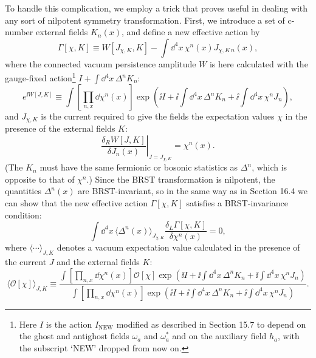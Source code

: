 To handle this complication, we employ a trick that proves useful in dealing with any sort of nilpotent symmetry transformation. First, we introduce a set of c-number external fields $K_n(x)$, and define a new effective action by
\begin{equation}
\Gamma[\chi,K]\equiv W[J_{\chi,K},K]
-\int \dd^4x\,\chi^n(x)J_{\chi,K\,n}(x),
\tag{17.1.3}\label{eq:17.1.3}
\end{equation}
where the connected vacuum persistence amplitude $W$ is here calculated with the gauge-fixed action\footnote{Here $I$ is the action $I_{\mathrm{NEW}}$ modified as described in Section 15.7 to depend on the ghost and antighost fields $\omega_a$ and $\omega_a^*$ and on the auxiliary field $h_a$, with the subscript `NEW' dropped from now on.} $I+\int \dd^4x\,\Delta^nK_n$:
\begin{equation}
e^{\ii W[J,K]}\equiv
\int\left[\prod_{n,x}\dd\chi^n(x)\right]
\exp\left(\ii I+\ii\int \dd^4x\,\Delta^nK_n
+\ii\int \dd^4x\,\chi^nJ_n\right),
\tag{17.1.4}\label{eq:17.1.4}
\end{equation}
and $J_{\chi,K}$ is the current required to give the fields the expectation values $\chi$ in the presence of the external fields $K$:
\begin{equation}
\left.\frac{\delta_R W[J,K]}{\delta J_n(x)}\right|_{J=J_{\chi,K}}
=\chi^n(x).
\tag{17.1.5}\label{eq:17.1.5}
\end{equation}
(The $K_n$ must have the same fermionic or bosonic statistics as $\Delta^n$, which is opposite to that of $\chi^n$.) Since the BRST transformation is nilpotent, the quantities $\Delta^n(x)$ are BRST-invariant, so in the same way as in Section 16.4 we can show that the new effective action $\Gamma[\chi,K]$ satisfies a BRST-invariance condition:
\begin{equation}
\int \dd^4x\,\langle\Delta^n(x)\rangle_{J_{\chi,K}}
\frac{\delta_L\Gamma[\chi,K]}{\delta\chi^n(x)}=0,
\tag{17.1.6}\label{eq:17.1.6}
\end{equation}
where $\langle\cdots\rangle_{J,K}$ denotes a vacuum expectation value calculated in the presence of the current $J$ and the external fields $K$:
\begin{equation}
\langle\mathcal O[\chi]\rangle_{J,K}\equiv
\frac{
\int\left[\prod_{n,x}\dd\chi^n(x)\right]\mathcal O[\chi]
\exp\left(\ii I+\ii\int \dd^4x\,\Delta^nK_n+\ii\int \dd^4x\,\chi^nJ_n\right)
}{
\int\left[\prod_{n,x}\dd\chi^n(x)\right]
\exp\left(\ii I+\ii\int \dd^4x\,\Delta^nK_n+\ii\int \dd^4x\,\chi^nJ_n\right)
}.
\tag{17.1.7}\label{eq:17.1.7}
\end{equation}
